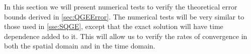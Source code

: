 In this section we will present numerical tests to verify the theoretical error bounds derived in
\autoref{sec:QGEError}. The numerical tests will be very similar to those used in
\autoref{sse:SQGE}, except that the exact solution will have time dependence added to it. This will
allow us to verify the rates of convergence in both the spatial domain and in the time domain.
